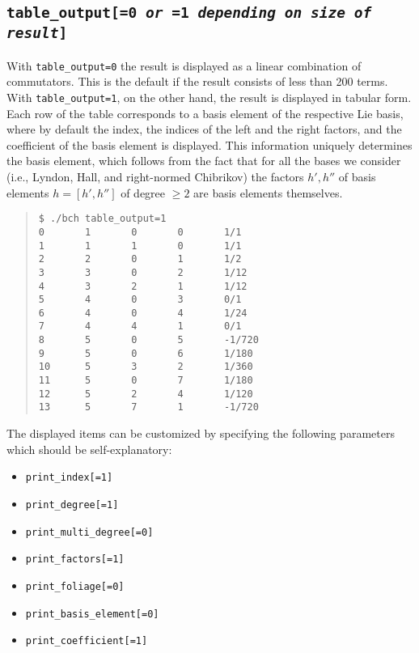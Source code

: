\documentclass[11pt,a4paper]{article}
\begin{document}
\subsection*{\tt table\_output[=0 {\em or} =1 {\em depending on size of result}]}
With \verb|table_output=0| the result is displayed as a linear combination of commutators. 
This is the default if the result consists of less than 200 terms.
With
\verb|table_output=1|, on the other hand, the result is displayed in tabular form.
Each row of the table corresponds to a basis element of the respective Lie basis,
where by default the index, the indices of the left and
the right factors, and the coefficient of the basis element is displayed. 
This information uniquely determines the basis element, which follows from the
fact that 
for all the bases we consider (i.e., Lyndon, Hall, and right-normed Chibrikov) the factors $h', h''$ of basis elements $h=[h',h'']$ of degree $\geq 2$ are
basis elements themselves.
\begin{quote} %
{\small\begin{BVerbatim}
$ ./bch table_output=1
0       1       0       0       1/1
1       1       1       0       1/1
2       2       0       1       1/2
3       3       0       2       1/12
4       3       2       1       1/12
5       4       0       3       0/1
6       4       0       4       1/24
7       4       4       1       0/1
8       5       0       5       -1/720
9       5       0       6       1/180
10      5       3       2       1/360
11      5       0       7       1/180
12      5       2       4       1/120
13      5       7       1       -1/720
\end{BVerbatim}
}\end{quote}
The displayed items can be customized by specifying the following parameters
which should be self-explanatory:
\begin{itemize}
\item {\tt print\_index[=1]}
\item {\tt print\_degree[=1]}
\item {\tt print\_multi\_degree[=0]}
\item {\tt print\_factors[=1]}
\item {\tt print\_foliage[=0]}
\item {\tt print\_basis\_element[=0]}
\item {\tt print\_coefficient[=1]}
\end{itemize}
\end{document}
